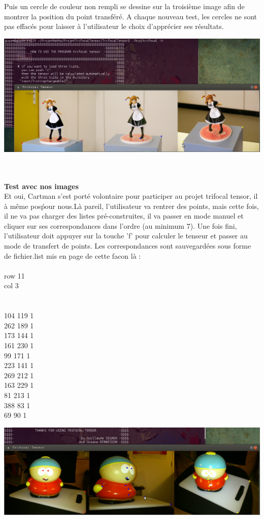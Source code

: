 \documentclass[a4paper,11pt,fleqn]{report}
\begin{document}
	Puis un cercle de couleur non rempli se dessine sur la troisi\`eme image afin de montrer la position du point transf\'er\'e. A chaque nouveau test, les cercles ne sont pas effac\'es pour laisser \`a l'utilisateur le choix d'appr\'ecier ses r\'esultats.
	\begin{center}\includegraphics[scale=0.50]{./capture4.png}\end{center}\\\\
	\textbf{Test avec nos images}\\
	Et oui, Cartman s'est port\'e volontaire pour participer au projet trifocal tensor, il \`a m\^eme pos\' pour nous.L\`a pareil, l'utilisateur va rentrer des points, mais cette fois, il ne va pas charger des listes pr\'e-construites, il va passer en mode manuel et cliquer sur ses correspondances dans l'ordre (au minimum 7). Une fois fini, l'utilisateur doit appuyer sur la touche 'f' pour calculer le tenseur et passer au mode de transfert de points. Les correspondances sont sauvegard\'ees sous forme de fichier.list mis en page de cette facon l\`a :\\\\
row 11\\
col 3\\
 \\\\
104 119   1\\
262 189   1\\
173 144   1\\
161 230   1\\
 99 171   1\\
223 141   1\\
269 212   1\\
163 229   1\\
 81 213   1\\
388  83   1\\
 69  90   1\\
	\begin{center}\includegraphics[scale=0.50]{./cartman1.png}\end{center}\\
\end{document}
